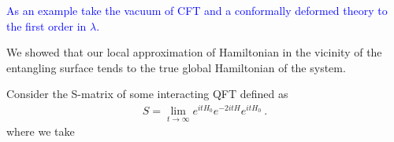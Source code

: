 \documentclass[a4paper,11pt]{article}
\theoremstyle{definition}
\newcommand{\NL}[1]{\textcolor{blue}{#1}}
\begin{document}
\NL{As an example take the vacuum of CFT and a conformally deformed theory to the first order in $\lambda$.}





We showed that our local approximation of Hamiltonian in the vicinity of the entangling surface tends to the true global Hamiltonian of the system. 

Consider the S-matrix of some interacting QFT defined as
\begin{eqnarray}
S=\lim_{t\to \infty} e^{i t H_0}e^{-2i t H}e^{it H_0}\ .
\end{eqnarray}
where we take




\end{document}
